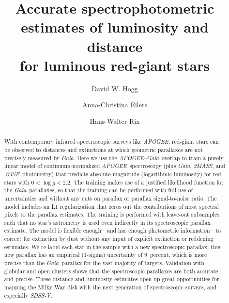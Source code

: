 \documentclass[modern]{aastex62}
\newcommand{\acronym}[1]{{\small{#1}}}
\newcommand{\project}[1]{\textsl{#1}}
\newcommand{\apogee}{\project{\acronym{APOGEE}}}
\newcommand{\gaia}{\project{Gaia}}
\newcommand{\wise}{\project{\acronym{WISE}}}
\newcommand{\zmass}{\project{\acronym{2MASS}}}
\newcommand{\sdssv}{\project{\acronym{SDSS-V}}}
\newcommand{\logg}{\log g}
\begin{document}
\sloppy\sloppypar\raggedbottom\frenchspacing %

\title{\textbf{%
Accurate spectrophotometric estimates of luminosity and distance\\
for luminous red-giant stars%
}}

\author[0000-0003-2866-9403]{David W. Hogg}

\author[0000-0003-2895-6218]{Anna-Christina Eilers}

\author[0000-0003-4996-9069]{Hans-Walter Rix}

\begin{abstract}\noindent
With contemporary infrared spectroscopic surveys like \apogee,
red-giant stars can be observed to distances and extinctions
at which geometric parallaxes are not precisely measured by \gaia.
Here we use the \apogee--\gaia\ overlap to train a purely linear model of
continuum-normalized \apogee\ spectroscopy
(plus \gaia, \zmass, and \wise\ photometry)
that predicts absolute magnitude (logarithmic luminosity) for red stars with $0<\logg<2.2$.
The training makes use of a justified likelihood function for the \gaia\ parallaxes,
so that the training can be performed with full use of uncertainties and
without any cuts on parallax or parallax signal-to-noise ratio.
The model includes an L1 regularization that zeros out the contributions of
most spectral pixels to the parallax estimates.
The training is performed
with leave-out subsamples such that no star's astrometry is used even indirectly in its
spectroscopic parallax estimate.
The model is flexible enough---and has enough photometric information---to
correct for extinction by dust without any
input of explicit extinction or reddening estimates.
We re-label each star in the sample
with a new spectroscopic parallax; this new parallax has an empirical (1-sigma)
uncertainty of 9~percent, which is more precise than the \gaia\ parallax
for the vast majority of targets.
Validation with globular and open clusters shows that the spectroscopic parallaxes
are both accurate and precise.
These distance and luminosity estimates open up great opportunities for
mapping the Milky Way disk with the next
generation of spectroscopic surveys, and especially \sdssv.
\end{abstract}
\end{document}
